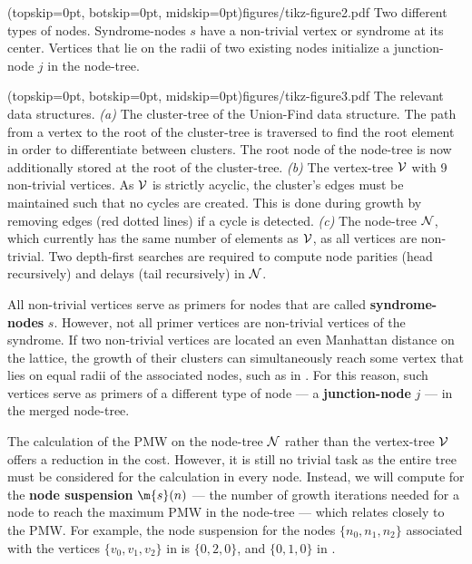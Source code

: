 \Figure[htb](topskip=0pt, botskip=0pt, midskip=0pt){figures/tikz-figure2.pdf}{
    Two different types of nodes. Syndrome-nodes $s$ have a non-trivial vertex or syndrome at its center. Vertices that lie on the radii of two existing nodes initialize a junction-node $j$ in the node-tree.\label{fig2}}

\Figure[hbt](topskip=0pt, botskip=0pt, midskip=0pt){figures/tikz-figure3.pdf}{
    The relevant data structures. \emph{(a)} The cluster-tree of the Union-Find data structure. The path from a vertex to the root of the cluster-tree is traversed to find the root element in order to differentiate between clusters. The root node of the node-tree is now additionally stored at the root of the cluster-tree. \emph{(b)} The vertex-tree $\mathcal{V}$ with 9 non-trivial vertices. As $\mathcal{V}$ is strictly acyclic, the cluster's edges must be maintained such that no cycles are created. This is done during growth by removing edges (red dotted lines) if a cycle is detected. \emph{(c)} The node-tree $\mathcal{N}$, which currently has the same number of elements as $\mathcal{V}$, as all vertices are non-trivial. Two depth-first searches are required to compute node parities (head recursively) and delays (tail recursively) in $\mathcal{N}$.\label{fig3}}

All non-trivial vertices serve as primers for nodes that are called \textbf{syndrome-nodes} $s$. However, not all primer vertices are non-trivial vertices of the syndrome. If two non-trivial vertices are located an even Manhattan distance on the lattice, the growth of their clusters can simultaneously reach some vertex that lies on equal radii of the associated nodes, such as in . For this reason, such vertices serve as primers of a different type of node --- a \textbf{junction-node} $j$ --- in the merged node-tree. 

The calculation of the PMW on the node-tree $\mathcal{N}$ rather than the vertex-tree $\mathcal{V}$ offers a reduction in the cost. However, it is still no trivial task as the entire tree must be considered for the calculation in every node. Instead, we will compute for the \textbf{node suspension} $\m{s}(n)$ --- the number of growth iterations needed for a node to reach the maximum PMW in the node-tree --- which relates closely to the PMW. For example, the node suspension for the nodes $\{n_0, n_1, n_2\}$ associated with the vertices $\{v_0, v_1, v_2\}$ in  is $\{0, 2, 0\}$, and $\{0, 1, 0\}$ in .

